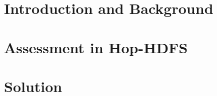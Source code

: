 \documentclass[a4paper,11pt,twoside,onecolumn,final,openright]{book}
\begin{document}


\pagestyle{headings}




\part{Introduction and Background}
\thispagestyle{empty}
\thispagestyle{empty}

\newpage
\thispagestyle{empty}


     


\part{Assessment in Hop-HDFS}
\thispagestyle{empty}
\thispagestyle{empty}

\newpage
\thispagestyle{empty}





\part{Solution}
\thispagestyle{empty}
\thispagestyle{empty}
\end{document}
